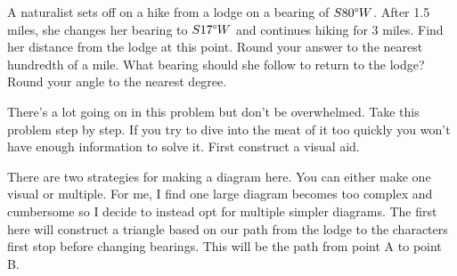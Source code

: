 \begin{problem}[22]
    A naturalist sets off on a hike from a lodge on a bearing of $S 80\degree W$. After 1.5 miles, she changes her bearing to $S 17\degree W$ and continues hiking for 3 miles. Find her distance from the lodge at this point. Round your answer to the nearest hundredth of a mile. What bearing should she follow to return to the lodge? Round your angle to the nearest degree.
\end{problem}

\begin{solution}
    There's a lot going on in this problem but don't be overwhelmed. Take this problem step by step. If you try to dive into the meat of it too quickly you won't have enough information to solve it. First construct a visual aid. 
    
    There are two strategies for making a diagram here. You can either make one visual or multiple. For me, I find one large diagram becomes too complex and cumbersome so I decide to instead opt for multiple simpler diagrams. The first here will construct a triangle based on our path from the lodge to the characters first stop before changing bearings. This will be the path from point A to point B. 
    
    

\end{solution}

